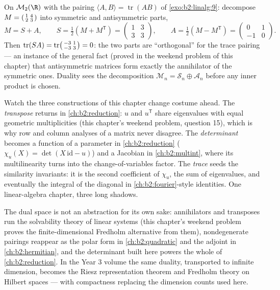 \begin{example}\label{ex:b2:linalg:tracepairing}
On $\mathcal{M}_2(\R)$ with the pairing $\langle A, B\rangle =
\operatorname{tr}(AB)$ of \cref{exo:b2:linalg:9}: decompose $M =
\begin{psmallmatrix}1 & 4\\ 2 & 3\end{psmallmatrix}$ into
symmetric and antisymmetric parts,
\[
M = S + A, \qquad
S = \tfrac12(M + M^{\mathsf T}) =
\begin{pmatrix}1 & 3\\ 3 & 3\end{pmatrix},
\qquad
A = \tfrac12(M - M^{\mathsf T}) =
\begin{pmatrix}0 & 1\\ -1 & 0\end{pmatrix}.
\]
Then $\operatorname{tr}(SA) = \operatorname{tr}
\begin{psmallmatrix}-3 & 1\\ -3 & 3\end{psmallmatrix} = 0$: the
two parts are ``orthogonal'' for the trace pairing --- an
instance of the general fact (proved in the weekend problem of
this chapter) that antisymmetric matrices form exactly the
annihilator of the symmetric ones. Duality sees the
decomposition $\mathcal{M}_n = \mathcal{S}_n \oplus
\mathcal{A}_n$ before any inner product is chosen.
\end{example}

\begin{remark}\label{rem:b2:linalg:perspectives}
Watch the three constructions of this chapter change costume
ahead. The \emph{transpose} returns in
\cref{ch:b2:reduction}: $u$ and $u^{\mathsf T}$ share
eigenvalues with equal geometric multiplicities (this chapter's
weekend problem, question 15), which is why row and column
analyses of a matrix never disagree. The \emph{determinant}
becomes a function of a parameter in \cref{ch:b2:reduction}
($\chi_u(X) = \det(X\,\mathrm{id} - u)$) and a Jacobian in
\cref{ch:b2:multint}, where its multilinearity turns into the
change-of-variables factor. The \emph{trace} seeds the
similarity invariants: it is the second coefficient of
$\chi_u$, the sum of eigenvalues, and eventually the integral
of the diagonal in \cref{ch:b2:fourier}-style identities. One
linear-algebra chapter, three long shadows.
\end{remark}

\begin{remark}
The dual space is not an abstraction for its own sake: annihilators
and transposes run the solvability theory of linear systems (this
chapter's weekend problem proves the finite-dimensional Fredholm
alternative from them), nondegenerate pairings reappear as the
polar form in \cref{ch:b2:quadratic} and the adjoint in
\cref{ch:b2:hermitian}, and the determinant built here powers the
whole of \cref{ch:b2:reduction}. In the Year 3 volume the same
duality, transported to infinite dimension, becomes the
Riesz representation theorem and Fredholm theory on Hilbert
spaces --- with compactness replacing the dimension counts used
here.
\end{remark}

